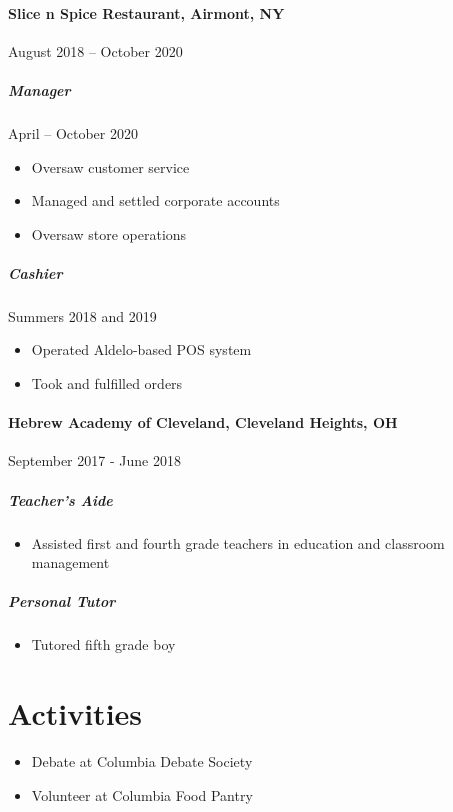 \documentclass[10pt]{article}
\begin{document}
    \paragraph*{Slice n Spice Restaurant, Airmont, NY} \hfill August 2018 – October 2020
    \subparagraph*{Manager} \hfill April – October 2020
    \begin{itemize}
        \item Oversaw customer service
        \item Managed and settled corporate accounts
        \item Oversaw store operations
    \end{itemize}
    \subparagraph*{Cashier} \hfill Summers 2018 and 2019
    \begin{itemize}
        \item Operated Aldelo-based POS system
        \item Took and fulfilled orders
    \end{itemize}

    \paragraph*{Hebrew Academy of Cleveland, Cleveland Heights, OH} \hfill  September 2017 - June 2018
    \subparagraph*{Teacher's Aide}
    \begin{itemize}
        \item  Assisted first and fourth grade teachers in education and classroom management
    \end{itemize}
    \subparagraph*{Personal Tutor}
    \begin{itemize}
        \item Tutored fifth grade boy
    \end{itemize}


\section*{Activities}

    \begin{itemize}
        \item Debate at Columbia Debate Society
        \item Volunteer at Columbia Food Pantry
    \end{itemize}



\end{document}
